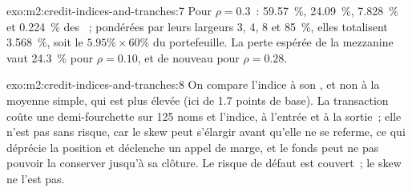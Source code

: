 \begin{solution}{exo:m2:credit-indices-and-tranches:7}
Pour $\rho = 0.3$~: 59.57~\%, 24.09~\%, 7.828~\% et 0.224~\% des ~; pondérées par leurs
largeurs 3, 4, 8 et 85~\%, elles totalisent 3.568~\%, soit le $5.95\% \times 60\%$ du portefeuille.
La perte espérée de la mezzanine vaut 24.3~\% pour $\rho = 0.10$, et de nouveau pour $\rho = 0.28$.
\end{solution}

\begin{solution}{exo:m2:credit-indices-and-tranches:8}
On compare l'indice à son , et non à la moyenne simple, qui est
plus élevée (ici de 1.7 points de base). La transaction coûte une demi-fourchette sur 125 noms et
l'indice, à l'entrée et à la sortie~; elle n'est pas sans risque, car le skew peut s'élargir avant
qu'elle ne se referme, ce qui déprécie la position et déclenche un appel de marge, et le fonds peut
ne pas pouvoir la conserver jusqu'à sa clôture. Le risque de défaut est couvert~; le skew ne l'est pas.
\end{solution}

